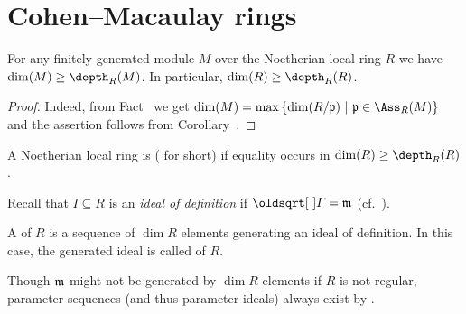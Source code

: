 \documentclass[a4paper,parskip=half,numbers=enddot, DIV=12]{scrreprt}
\begin{document}
\section{Cohen--Macaulay rings}
\begin{fact}
	For any finitely generated module $M$ over the Noetherian local ring $R$ we have $\dim(M)\geq\depth_R(M)$. In particular, $\dim(R)\geq\depth_R(R)$.
\end{fact}
\begin{proof}
	Indeed, from Fact~ we get $\dim(M)=\max\left\{\dim(R/\pp)\st \pp\in\Ass_R(M)\right\}$ and the assertion follows from Corollary~.
\end{proof}
\begin{defi}
	A Noetherian local ring is  ( for short) if equality occurs in $\dim(R)\geq\depth_R(R)$.
\end{defi}
Recall that $I\subseteq R$ is an \emph{ideal of definition} if $\sqrt{I}=\mm$ (cf.\ \cite[Definition~3.4.2]{alg2}). 
\begin{defi}
	A  of $R$ is a sequence of $\dim R$ elements generating an ideal of definition. In this case, the generated ideal is called  of $R$.
\end{defi}
Though $\mathfrak{m}$ might not be generated by $\dim R$ elements if $R$ is not regular, parameter sequences (and thus parameter ideals) always exist by \cite[Theorem~20]{alg2}.
\end{document}
